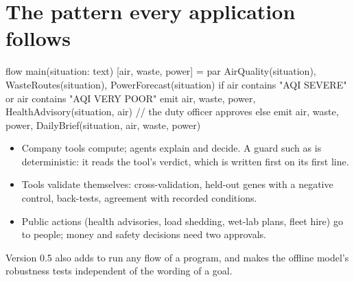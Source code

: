\section{The pattern every application follows}

\begin{algo}[title=enterprise-apps/smart-city-operations/programs/city\_operations.algo (flow)]
flow main(situation: text) {
    [air, waste, power] = par { AirQuality(situation), WasteRoutes(situation), PowerForecast(situation) }
    if air contains "AQI SEVERE" or air contains "AQI VERY POOR" {
        emit air, waste, power, HealthAdvisory(situation, air)   // the duty officer approves
    } else {
        emit air, waste, power, DailyBrief(situation, air, waste, power)
    }
}
\end{algo}

\begin{itemize}
\item Company tools compute; agents explain and decide. A guard such as  is deterministic: it reads the tool's verdict, which is written first on its first line.
\item Tools validate themselves: cross-validation, held-out genes with a negative control, back-tests, agreement with recorded conditions.
\item Public actions (health advisories, load shedding, wet-lab plans, fleet hire) go to people; money and safety decisions need two approvals.
\end{itemize}

Version 0.5 also adds  to run any flow of a program, and makes the offline model's robustness tests independent of the wording of a goal.
